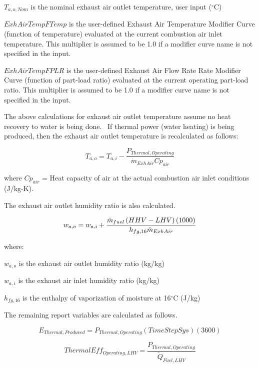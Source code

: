 \({T_{a,o,Nom}}\) is the nominal exhaust air outlet temperature, user input (\(^{\circ}\)C)

\(ExhAirTempFTemp\) is the user-defined Exhaust Air Temperature Modifier Curve (function of temperature) evaluated at the current combustion air inlet temperature. This multiplier is assumed to be 1.0 if a modifier curve name is not specified in the input.

\(ExhAirTempFPLR\) is the user-defined Exhaust Air Flow Rate Rate Modifier Curve (function of part-load ratio) evaluated at the current operating part-load ratio. This multiplier is assumed to be 1.0 if a modifier curve name is not specified in the input.

The above calculations for exhaust air outlet temperature assume no heat recovery to water is being done.~ If thermal power (water heating) is being produced, then the exhaust air outlet temperature is recalculated as follows:

\begin{equation}
T_{a,o} = T_{a,i} - \frac{P_{Thermal,Operating}}{\dot{m}_{ExhAir}Cp_{air}}
\end{equation}

where \(C{p_{air}}\) = Heat capacity of air at the actual combustion air inlet conditions (J/kg-K).

The exhaust air outlet humidity ratio is also calculated.

\begin{equation}
  w_{a,o} = w_{a,i} + \frac{\dot{m}_{fuel} \left(HHV - LHV\right) \left(1000\right)}{h_{fg,16} \dot{m}_{ExhAir}}
\end{equation}

where:

\({w_{a,o}}\) is the exhaust air outlet humidity ratio (kg/kg)

\({w_{a,i}}\) is the exhaust air inlet humidity ratio (kg/kg)

\({h_{fg,16}}\) is the enthalpy of vaporization of moisture at 16\(^{\circ}\)C (J/kg)

The remaining report variables are calculated as follows.

\begin{equation}
{E_{Thermal,Produced}} = {P_{Thermal,Operating}}\left( {TimeStepSys} \right)\left( {3600} \right)
\end{equation}

\begin{equation}
ThermalEff_{Operating,LHV} = \frac{P_{Thermal,Operating}}{\dot{Q}_{Fuel,LHV}}
\end{equation}

